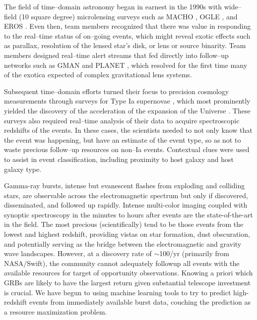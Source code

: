  \smallskip

The field of time--domain astronomy began in earnest in the 1990s with
wide--field (10 square degree) microlensing surveys such as MACHO
\citep{2000ApJ...542..281A}, OGLE \citep{1994AcA....44..227U}, and EROS
\citep{2003A&A...400..951A}.   Even then, team members recognized that there was
value in responding to the real--time status of on--going events, which might
reveal exotic effects such as parallax, resolution of the lensed star's disk, or
lens or source binarity.  Team members designed real--time alert streams that
fed directly into follow--up networks such as GMAN \citep{2000PhDT.......258B}
and PLANET \citep{1998ApJ...509..687A}, which resolved for the first time many
of the exotica expected of complex gravitational lens systems.

Subsequent time--domain efforts turned their focus to precision cosmology
measurements through surveys for Type Ia supernovae \citep{1996AJ....112.2398H},
which most prominently yielded the discovery of the acceleration of the
expansion of the Universe \citep{1998AJ....116.1009R,1999ApJ...517..565P}. These
surveys also required real--time analysis of their data to acquire spectroscopic
redshifts of the events. In these cases, the scientists needed to not only know
that the event was happening, but have an estimate of the event type, so as not
to waste precious follow--up resources on non--Ia events.  Contextual clues were
used to assist in event classification, including proximity to host galaxy and
host galaxy type.

Gamma-ray bursts, intense but evanescent flashes from exploding and colliding
stars, are observable across the electromagnetic spectrum but only if
discovered, disseminated, and followed up rapidly. Intense multi-color imaging
coupled with synoptic spectroscopy in the minutes to hours after events are the
state-of-the-art in the field. The most precious (scientifically) tend to be
those events from the lowest and highest redshift, providing vistas on star
formation, dust obscuration, and potentially serving as the bridge between the
electromagnetic and gravity wave landscapes. However, at a discovery rate of
$\sim$100/yr (primarily from NASA/Swift), the community cannot adequately
followup all events with the available resources for target of opportunity
observations. Knowing a priori which GRBs are likely to have the largest return
given substantial telescope investment is crucial. We \citep{morgan} have begun
to using machine learning tools to try to predict high-redshift events from
immediately available burst data, couching the prediction as a resource
maximization problem.


